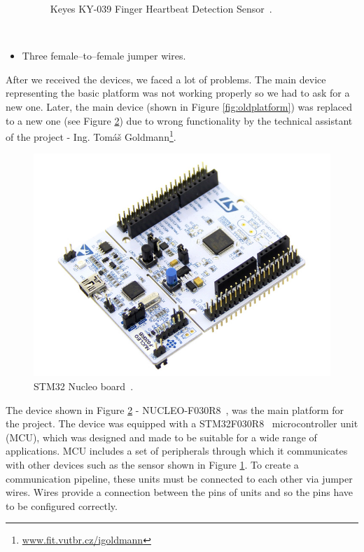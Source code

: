 \documentclass[11pt,a4paper]{article}
\newcommand{\tilda}{\raisebox{0.5ex}{\texttildelow}}
\begin{document}
\begin{itemize}
\begin{figure}[H]
            \caption{Keyes KY-039 Finger Heartbeat Detection Sensor~\cite{IMG-SENSOR-1}.}
            \label{fig:senzor1}
        \end{figure}
        \hfill\\[-18mm]
    \item Three female--to--female jumper wires.\\[-2.5mm]
\end{itemize}

After we received the devices, we faced a lot of problems. The main device representing the basic platform was not working properly so we had to ask for a new one. Later, the main device (shown in Figure \ref{fig:oldplatform}) was replaced to a new one (see Figure \ref{fig:platform1}) due to wrong functionality by the technical assistant of the project - Ing. Tomáš Goldmann\footnote{\href{http://www.fit.vutbr.cz/~igoldmann/}{www.fit.vutbr.cz/{\tilda}igoldmann}}.

\newpage

\begin{figure}[H]
    \centering
    \includegraphics[scale=0.4]{img/device1.jpg}
    \caption{STM32 Nucleo board~\cite{IMG-DEVICE-1}.}
    \label{fig:platform1}
\end{figure}

\indent The device shown in Figure \ref{fig:platform1} - NUCLEO-F030R8~\cite{PLATFORM}, was the main platform for the project. The device was equipped with a STM32F030R8~\cite{MCU} microcontroller unit (MCU), which was designed and made to be suitable for a wide range of applications. MCU includes a set of peripherals through which it communicates with other devices such as the sensor shown in Figure \ref{fig:senzor1}. To create a communication pipeline, these units must be connected to each other via jumper wires. Wires provide a connection between the pins of units and so the pins have to be configured correctly.
\end{document}
